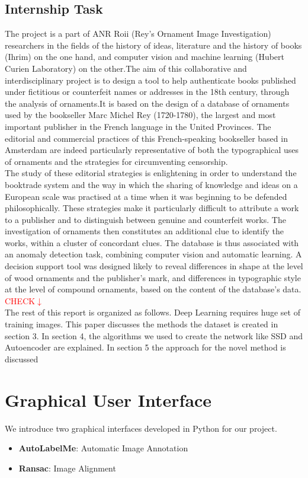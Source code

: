 \documentclass[12pt]{article}
\begin{document}
\subsection{Internship Task}
The project is a part of ANR Roii (Rey's Ornament Image Investigation) researchers in the fields of the history of ideas, literature and the history of books (Ihrim) on the one hand, and computer vision and machine learning (Hubert Curien Laboratory) on the other.The aim of this collaborative and interdisciplinary project is to design a tool to help authenticate books published under fictitious or counterfeit names or addresses in the 18th century, through the analysis of ornaments.It is based on the design of a database of ornaments used by the bookseller Marc Michel Rey (1720-1780), the largest and most important publisher in the French language in the United Provinces.
The editorial and commercial practices of this French-speaking bookseller based in Amsterdam are indeed particularly representative of both the typographical uses of ornaments and the strategies for circumventing censorship. \\
The study of these editorial strategies is enlightening in order to understand the booktrade system and the way in which the sharing of knowledge and ideas on a European scale was practised at a time when it was beginning to be defended philosophically. These strategies make it particularly difficult to attribute a work to a publisher and to distinguish between genuine and counterfeit works. The investigation of ornaments then constitutes an additional clue to identify the works, within a cluster of concordant clues. The database is thus associated with an anomaly detection task, combining computer vision and automatic learning. A decision support tool was designed likely to reveal differences in shape at the level of wood ornaments and the publisher's mark, and differences in typographic style at the level of compound ornaments, based on the content of the database's data. \\
\textcolor{red}{CHECK$\downarrow$}\\
The rest of this report is organized as follows. Deep Learning requires huge set of training images. This paper discusses the methods the dataset is created in section 3. In section 4, the algorithms we used to create the network like SSD and Autoencoder are explained. In section 5 the approach for the novel method is discussed

\section{Graphical User Interface}
We introduce two graphical interfaces developed in Python for our project.
\begin{itemize}
    \item \textbf{AutoLabelMe}: Automatic Image Annotation
    \item \textbf{Ransac}: Image Alignment
\end{itemize}
\end{document}
